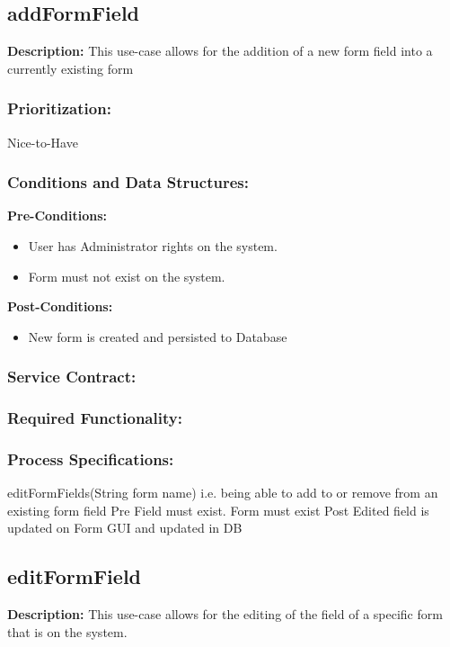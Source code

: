 \subsection{addFormField}
\textbf{Description:}
This use-case allows for the addition of a new form field into a currently existing form
\subsubsection{Prioritization:}
Nice-to-Have
\subsubsection{Conditions and Data Structures:}
\textbf{Pre-Conditions:}
\begin{itemize}
	\item User has Administrator rights on the system.
	\item Form must not exist on the system.
\end{itemize}

\textbf{Post-Conditions:}	
\begin{itemize}
	\item New form is created and persisted to Database
\end{itemize}
\subsubsection{Service Contract:} 
\subsubsection{Required Functionality:} 
\subsubsection{Process Specifications:} 




editFormFields(String form name)
i.e. 
being able to add to or remove from an existing form field	
Pre Field must exist. 
	Form must exist	
Post Edited field is updated on Form GUI and updated in DB

\subsection{editFormField}
\textbf{Description:}
This use-case allows for the editing of the field of a specific form that is on the system.
